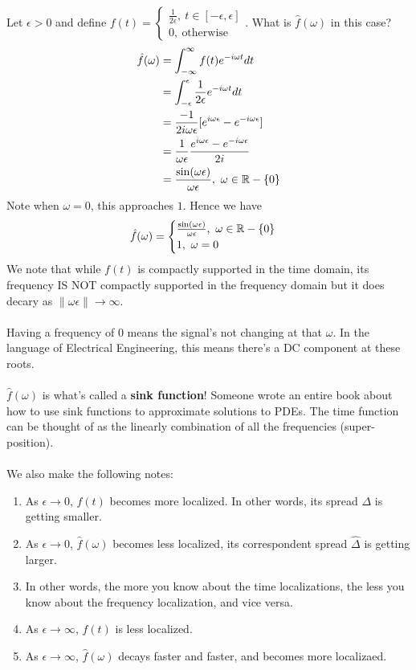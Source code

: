 \documentclass{article}
\begin{document}
\begin{example}
    Let $\epsilon > 0$ and define $f(t) = \begin{cases}
        \frac{1}{2\epsilon},\ t \in [-\epsilon, \epsilon]\\
        0,\ \text{otherwise}
    \end{cases}$. What is $\hat{f}(\omega)$ in this case?
    \begin{align*}
        \hat{f}(\omega) &= \int_{-\infty}^\infty f(t) e^{-i\omega t} dt\\
        &= \int_{-\epsilon}^\epsilon \frac{1}{2\epsilon} e^{-i\omega t} dt\\
        &= \frac{-1}{2i \omega \epsilon} [e^{i\omega \epsilon} - e^{-i\omega \epsilon}]\\
        &= \frac{1}{\omega \epsilon} \frac{e^{i\omega \epsilon} - e^{-i\omega \epsilon}}{2i}\\
        &= \frac{\sin(\omega \epsilon)}{\omega \epsilon},\ \omega \in \mathbb{R} - \{0\}
    \end{align*}
    Note when $\omega = 0$, this approaches $1$. Hence we have
    \[\hat{f}(\omega) = \begin{cases}
        \frac{\sin(\omega \epsilon)}{\omega \epsilon},\ \omega \in \mathbb{R} - \{0\}\\
        1,\ \omega = 0
    \end{cases}\]
    We note that while $f(t)$ is compactly supported in the time domain, its frequency IS NOT compactly supported in the frequency domain but it does decary as $\|\omega \epsilon\| \to \infty$.\\\\
    Having a frequency of $0$ means the signal's not changing at that $\omega$. In the language of Electrical Engineering, this means there's a DC component at these roots.\\\\
    $\hat{f}(\omega)$ is what's called a \textbf{sink function}! Someone wrote an entire book about how to use sink functions to approximate solutions to PDEs. The time function can be thought of as the linearly combination of all the frequencies (super-position).\\\\
    We also make the following notes:
    \begin{enumerate}
        \item As $\epsilon \to 0$, $f(t)$ becomes more localized. In other words, its spread $\Delta$ is getting smaller.
        \item As $\epsilon \to 0$, $\hat{f}(\omega)$ becomes less localized, its correspondent spread $\hat{\Delta}$ is getting larger.
        \item In other words, the more you know about the time localizations, the less you know about the frequency localization, and vice versa.
        \item As $\epsilon \to \infty$, $f(t)$ is less localized.
        \item As $\epsilon \to \infty$, $\hat{f}(\omega)$ decays faster and faster, and becomes more localizaed.
    \end{enumerate}
\end{example}
\end{document}
